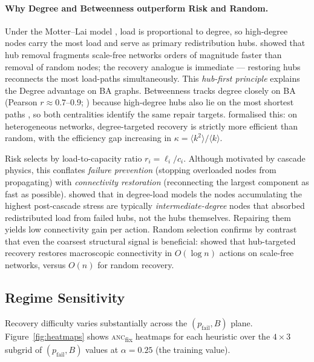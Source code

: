 \documentclass[11pt]{article}
\newcommand{\anc}{\textsc{anc}}
\newcommand{\ancfix}{\anc{}\textsubscript{fix}}
\newcommand{\pfail}{p_{\mathrm{fail}}}
\begin{document}
\paragraph{Why Degree and Betweenness outperform Risk and Random.}
Under the Motter--Lai model \citep{motter2002cascade}, load is
proportional to degree, so high-degree nodes carry the most load and
serve as primary redistribution hubs.
\citet{albert2000error} showed that hub removal fragments scale-free
networks orders of magnitude faster than removal of random nodes; the
recovery analogue is immediate — restoring hubs reconnects the most
load-paths simultaneously.
This \emph{hub-first principle} explains the Degree advantage on BA
graphs.
Betweenness tracks degree closely on BA (Pearson $r\approx 0.7$--$0.9$;
\citealt{barthelemy2004betweenness}) because high-degree hubs also lie
on the most shortest paths \citep{girvan2002community}, so both
centralities identify the same repair targets.
\citet{holme2002attack} formalised this: on heterogeneous networks,
degree-targeted recovery is strictly more efficient than random, with the
efficiency gap increasing in $\kappa = \langle k^2\rangle/\langle
k\rangle$.

Risk selects by load-to-capacity ratio $r_i = \ell_i/c_i$.
Although motivated by cascade physics, this conflates
\emph{failure prevention} (stopping overloaded nodes from propagating)
with \emph{connectivity restoration} (reconnecting the largest component
as fast as possible).
\citet{crucitti2004model} showed that in degree-load models the nodes
accumulating the highest post-cascade stress are typically
\emph{intermediate-degree} nodes that absorbed redistributed load from
failed hubs, not the hubs themselves.
Repairing them yields low connectivity gain per action.
Random selection confirms by contrast that even the coarsest structural
signal is beneficial: \citet{cohen2000resilience} showed that
hub-targeted recovery restores macroscopic connectivity in $O(\log n)$
actions on scale-free networks, versus $O(n)$ for random recovery.

\subsection{Regime Sensitivity}
\label{sec:regime}

Recovery difficulty varies substantially across the $(\pfail, B)$ plane.
Figure~\ref{fig:heatmaps} shows \ancfix{} heatmaps for each heuristic
over the $4\times 3$ subgrid of $(\pfail, B)$ values at $\alpha=0.25$
(the training value).
\end{document}
